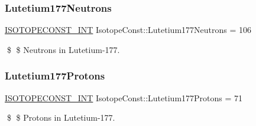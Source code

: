 \subsubsection{\texorpdfstring{Lutetium177\+Neutrons}{Lutetium177Neutrons}}
{\footnotesize\ttfamily \mbox{\hyperlink{group___isotope_const-_macros_ga5f18360b3e99483a35c32d789e62621c}{I\+S\+O\+T\+O\+P\+E\+C\+O\+N\+S\+T\+\_\+\+I\+NT}} Isotope\+Const\+::\+Lutetium177\+Neutrons = 106}

\$ \$ Neutrons in Lutetium-\/177. \mbox{\label{group___isotope_const-_lutetium-_lu177_ga747c4b02fdf6a7a8f87b5d88b99d7524}} 
\subsubsection{\texorpdfstring{Lutetium177\+Protons}{Lutetium177Protons}}
{\footnotesize\ttfamily \mbox{\hyperlink{group___isotope_const-_macros_ga5f18360b3e99483a35c32d789e62621c}{I\+S\+O\+T\+O\+P\+E\+C\+O\+N\+S\+T\+\_\+\+I\+NT}} Isotope\+Const\+::\+Lutetium177\+Protons = 71}

\$ \$ Protons in Lutetium-\/177. 